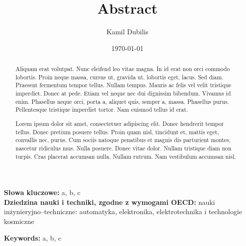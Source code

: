 \documentclass[../main.tex]{subfiles}
\author{Kamil Dubilis}
\date{\today}
\title{Abstract}
\begin{document}
\begin{abstract}
  Aliquam erat volutpat.  Nunc eleifend leo vitae magna.  In id erat non orci commodo lobortis.  Proin neque massa, cursus ut, gravida ut, lobortis eget, lacus.  Sed diam.  Praesent fermentum tempor tellus.  Nullam tempus.  Mauris ac felis vel velit tristique imperdiet.  Donec at pede.  Etiam vel neque nec dui dignissim bibendum.  Vivamus id enim.  Phasellus neque orci, porta a, aliquet quis, semper a, massa.  Phasellus purus.  Pellentesque tristique imperdiet tortor.  Nam euismod tellus id erat.
\end{abstract}
\textbf{Słowa kluczowe:} a, b, c\\
\textbf{Dziedzina nauki i techniki, zgodne z wymogami OECD:} nauki inżynieryjno--techniczne: automatyka, elektronika, elektrotechnika i technologie kosmiczne
\newpage
{}
\begin{abstract}
  Lorem ipsum dolor sit amet, consectetuer adipiscing elit.  Donec hendrerit tempor tellus.  Donec pretium posuere tellus.  Proin quam nisl, tincidunt et, mattis eget, convallis nec, purus.  Cum sociis natoque penatibus et magnis dis parturient montes, nascetur ridiculus mus.  Nulla posuere.  Donec vitae dolor.  Nullam tristique diam non turpis.  Cras placerat accumsan nulla.  Nullam rutrum.  Nam vestibulum accumsan nisl.
\end{abstract}
\textbf{Keywords:} a, b, c
\end{document}
